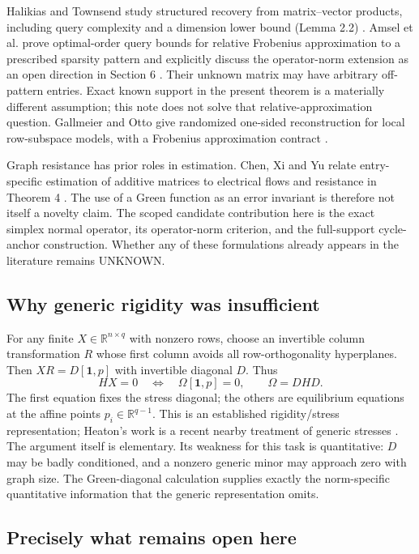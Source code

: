 \documentclass[11pt]{article}
\theoremstyle{remark}\newtheorem{remark}[theorem]{Remark}
\newcommand{\R}{\mathbb R}
\newcommand{\one}{\mathbf 1}
\begin{document}
Halikias and Townsend study structured recovery from matrix--vector products, including query complexity and a dimension lower bound (Lemma 2.2) \cite{halikias}. Amsel et al. prove optimal-order query bounds for relative Frobenius approximation to a prescribed sparsity pattern and explicitly discuss the operator-norm extension as an open direction in Section 6 \cite{amsel}. Their unknown matrix may have arbitrary off-pattern entries. Exact known support in the present theorem is a materially different assumption; this note does not solve that relative-approximation question. Gallmeier and Otto give randomized one-sided reconstruction for local row-subspace models, with a Frobenius approximation contract \cite{gallmeier}.

Graph resistance has prior roles in estimation. Chen, Xi and Yu relate entry-specific estimation of additive matrices to electrical flows and resistance in Theorem 4 \cite{chen}. The use of a Green function as an error invariant is therefore not itself a novelty claim. The scoped candidate contribution here is the exact simplex normal operator, its operator-norm criterion, and the full-support cycle-anchor construction. Whether any of these formulations already appears in the literature remains UNKNOWN.

\subsection{Why generic rigidity was insufficient}

For any finite $X\in\R^{n\times q}$ with nonzero rows, choose an invertible column transformation $R$ whose first column avoids all row-orthogonality hyperplanes. Then $XR=D[\one,p]$ with invertible diagonal $D$. Thus
\[
HX=0\quad\Longleftrightarrow\quad \Omega[\one,p]=0,
\qquad\Omega=DHD.
\]
The first equation fixes the stress diagonal; the others are equilibrium equations at the affine points $p_i\in\R^{q-1}$. This is an established rigidity/stress representation; Heaton's work is a recent nearby treatment of generic stresses \cite{heaton}. The argument itself is elementary. Its weakness for this task is quantitative: $D$ may be badly conditioned, and a nonzero generic minor may approach zero with graph size. The Green-diagonal calculation supplies exactly the norm-specific quantitative information that the generic representation omits.

\subsection{Precisely what remains open here}
\end{document}
